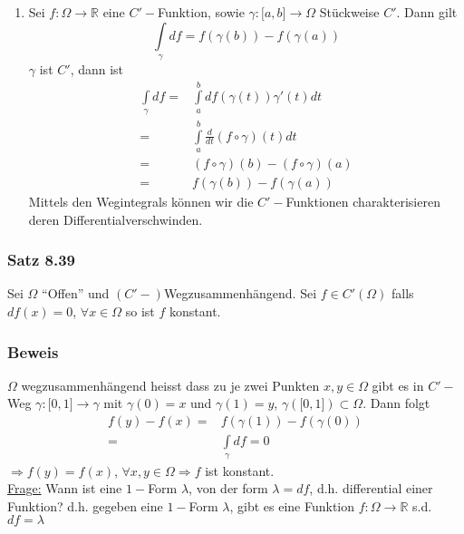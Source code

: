 \begin{enumerate}[\indent E1)]
\item Sei $f:\Omega\rightarrow\mathbb{R}$ eine $C'-$Funktion, sowie $\gamma:\lbrack a,b\rbrack\rightarrow\Omega$ Stückweise $C'$. Dann gilt \[\int\limits_\gamma  {df}  = f\left( {\gamma \left( b \right)} \right) - f\left( {\gamma \left( a \right)} \right)\]
$\gamma$ ist $C'$, dann ist 
\begin{align*}
\int\limits_\gamma  {df}  = & \int\limits_a^b {df\left( {\gamma \left( t \right)} \right)\gamma '\left( t \right)dt} \\
\mathop  = & \int\limits_a^b {\frac{d}{{dt}}\left( {f \circ \gamma } \right)\left( t \right)dt}\\ 
 = &\left( {f \circ \gamma } \right)\left( b \right) - \left( {f \circ \gamma } \right)\left( a \right)\\
 = & f\left( {\gamma \left( b \right)} \right) - f\left( {\gamma \left( a \right)} \right)
\end{align*}
Mittels den Wegintegrals können wir die $C'-$Funktionen charakterisieren deren Differentialverschwinden.
\end{enumerate}

\subsubsection*{Satz 8.39}
Sei $\Omega$ ``Offen'' und  $\left( C'-\right)$Wegzusammenhängend. Sei $f\in C'\left(\Omega\right)$ falls $df(x)=0$, $\forall x\in\Omega$ so ist $f$ konstant.
\subsubsection*{Beweis}
$\Omega$ wegzusammenhängend heisst dass zu je zwei Punkten $x,y\in\Omega$ gibt es in $C'-$Weg $\gamma :\lbrack 0,1\rbrack\rightarrow\gamma$ mit $\gamma(0)=x$ und $\gamma(1)=y$, $\gamma\left(\lbrack 0,1\rbrack\right)\subset\Omega$. Dann folgt
\begin{align*}
f(y)-f(x)=& f\left(\gamma(1)\right)-f\left(\gamma(0)\right)\\
= &\int\limits_{\gamma} df = 0
\end{align*}
$\Rightarrow f(y)=f(x)$, $\forall x,y\in\Omega\Rightarrow f$ ist konstant.\\

\noindent\underline{Frage:} Wann ist eine $1-$Form $\lambda$, von der form $\lambda = df$, d.h. differential einer Funktion? d.h. gegeben eine $1-$Form $\lambda$, gibt es eine Funktion $f:\Omega\rightarrow\mathbb{R}$ s.d. $df=\lambda$\\

